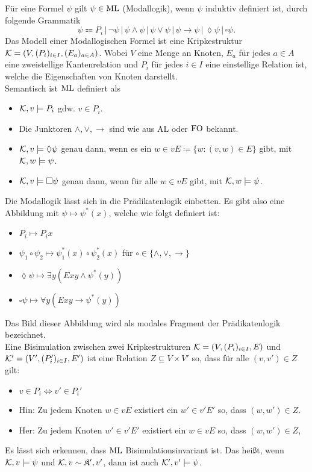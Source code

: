 Für eine Formel $\psi$ gilt $\psi\in \operatorname{ML}$ (Modallogik), wenn $\psi$ induktiv definiert ist, durch folgende Grammatik
\[\psi\Coloneqq P_i \,\vert\, \neg\psi \,\vert\, \psi\land\psi \,\vert\, \psi\lor\psi \,\vert\, \psi\rightarrow\psi \,\vert\, \lozenge\psi \,\vert\, \square\psi.\]
Das Modell einer Modallogischen Formel ist eine Kripkestruktur $\mathcal{K}=(V,(P_i)_{i\in I}, (E_a)_{a\in A})$. Wobei $V$ eine Menge an Knoten, $E_a$ für jedes $a\in A$ eine zweistellige Kantenrelation und $P_i$ für jedes $i\in I$ eine einstellige Relation ist, welche die Eigenschaften von Knoten darstellt.
\\
Semantisch ist $\operatorname{ML}$ definiert als
\begin{itemize}
	\item $\mathcal{K},v\models P_i$ gdw. $v\in P_i$.
	\item Die Junktoren $\land,\lor,\rightarrow$ sind wie aus AL oder $\operatorname{FO}$ bekannt.
	\item $\mathcal{K},v\models \lozenge \psi$ genau dann, wenn es ein $w\in vE\coloneqq\{w:(v,w)\in E\}$ gibt, mit $\mathcal{K},w\models \psi$.
	\item $\mathcal{K},v\models \square \psi$ genau dann, wenn für alle $w\in vE$ gibt, mit $\mathcal{K},w\models \psi$.
\end{itemize}
Die Modallogik lässt sich in die Prädikatenlogik einbetten. Es gibt also eine Abbildung mit $\psi\mapsto \psi^\ast(x)$, welche wie folgt definiert ist:
\begin{itemize}
	\item $P_i\mapsto P_i x$
	\item $\psi_1\circ \psi_2\mapsto \psi_1^\ast(x)\circ\psi_2^\ast(x)$ für $\circ\in\{\land,\lor,\rightarrow\}$
	\item $\lozenge\psi\mapsto\exists y (Exy \land \psi^\ast(y))$
	\item $\square\psi \mapsto \forall y (Exy\rightarrow \psi^\ast(y))$
\end{itemize}
Das Bild dieser Abbildung wird als modales Fragment der Prädikatenlogik bezeichnet.
\\
Eine Bisimulation zwischen zwei Kripkestrukturen $\mathcal{K}=(V,(P_i)_{i\in I}, E)$ und $\mathcal{K}'=(V',(P_i')_{i\in I}, E')$ ist eine Relation $Z\subseteq V\times V'$ so, dass für alle $(v,v')\in Z$ gilt:
\begin{itemize}
	\item $v\in P_i\Leftrightarrow v'\in P_i'$
	\item Hin: Zu jedem Knoten $w\in vE$ existiert ein $w'\in v'E'$ so, dass $(w,w')\in Z$.
	\item Her: Zu jedem Knoten $w'\in v'E'$ existiert ein $w\in vE$ so, dass $(w,w')\in Z$,
\end{itemize}
Es lässt sich erkennen, dass $\operatorname{ML}$ Bisimulationsinvariant ist. Das heißt, wenn $\mathcal{K},v\models \psi$ und $\mathcal{K},v\sim \mathfrak{K'},v'$, dann ist auch $\mathcal{K}',v'\models \psi$.



